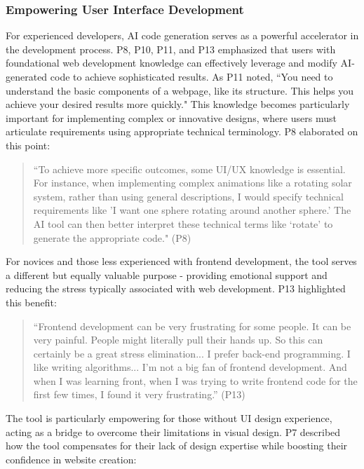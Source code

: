 \subsubsection{Empowering User Interface Development}

For experienced developers, AI code generation serves as a powerful accelerator in the development process. P8, P10, P11, and P13 emphasized that users with foundational web development knowledge can effectively leverage and modify AI-generated code to achieve sophisticated results. As P11 noted, ``You need to understand the basic components of a webpage, like its structure. This helps you achieve your desired results more quickly." This knowledge becomes particularly important for implementing complex or innovative designs, where users must articulate requirements using appropriate technical terminology. P8 elaborated on this point:

\begin{quote}
  ``To achieve more specific outcomes, some UI/UX knowledge is essential. For instance, when implementing complex animations like a rotating solar system, rather than using general descriptions, I would specify technical requirements like 'I want one sphere rotating around another sphere.' The AI tool can then better interpret these technical terms like `rotate' to generate the appropriate code." (P8)
\end{quote}

For novices and those less experienced with frontend development, the tool serves a different but equally valuable purpose - providing emotional support and reducing the stress typically associated with web development. P13 highlighted this benefit:

\begin{quote}
``Frontend development can be very frustrating for some people. It can be very painful. People might literally pull their hands up. So this can certainly be a great stress elimination... I prefer back-end programming. I like writing algorithms... I'm not a big fan of frontend development. And when I was learning front, when I was trying to write frontend code for the first few times, I found it very frustrating.'' (P13)
\end{quote}

The tool is particularly empowering for those without UI design experience, acting as a bridge to overcome their limitations in visual design. P7 described how the tool compensates for their lack of design expertise while boosting their confidence in website creation:


